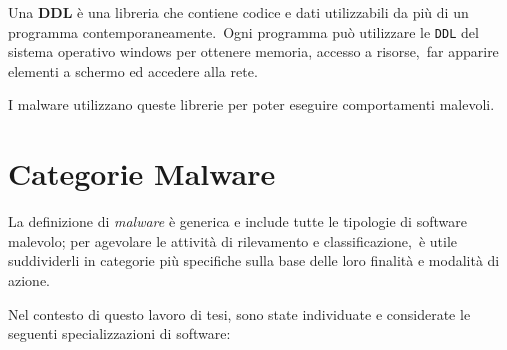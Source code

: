 Una \textbf{DDL} è una libreria che contiene codice e dati utilizzabili da più di un programma contemporaneamente.\
Ogni programma può utilizzare le \texttt{DDL} del sistema operativo windows per ottenere memoria, accesso a risorse,\
far apparire elementi a schermo ed accedere alla rete\cite{Microsoft-DLL}.

I malware utilizzano queste librerie per poter eseguire comportamenti malevoli.

\section{Categorie Malware}

La definizione di \textit{malware} è generica e include tutte le tipologie di software malevolo; per agevolare le attività di rilevamento e classificazione,\
è utile suddividerli in categorie più specifiche sulla base delle loro finalità e modalità di azione.

Nel contesto di questo lavoro di tesi, sono state individuate e considerate le seguenti specializzazioni di software:

